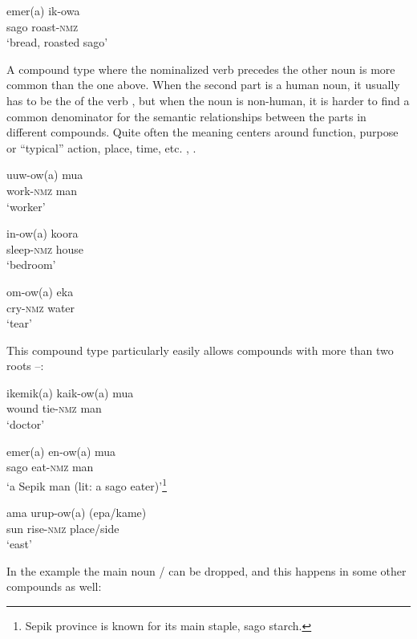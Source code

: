 \ea%
\label{ex:3:x1522}
\gll emer(a) ik-owa \\
sago roast-\textsc{nmz}\\
\glt`bread, roasted sago'
\z

A compound type where the nominalized verb precedes the other noun is more common than the one above. When the second part is a human noun, it usually has to be the  of the verb , but when the noun is non-human, it is harder to find a common denominator for the semantic relationships between the parts in different compounds. Quite often the meaning centers around function, purpose or ``typical'' action, place, time, etc. , .

\ea%
\label{ex:3:x52}
\gll uuw-ow(a) mua \\
work-\textsc{nmz} man\\
\glt`worker'
\z

\ea%
\label{ex:3:x53}
\gll in-ow(a) koora \\
sleep-\textsc{nmz} house\\
\glt`bedroom'
\z

\ea%
\label{ex:3:x54}
\gll om-ow(a) eka \\
cry-\textsc{nmz} water\\
\glt`tear'
\z

This compound type particularly easily allows compounds with more than two roots --: 

\ea%
\label{ex:3:x55}
\gll ikemik(a) kaik-ow(a) mua \\
wound tie-\textsc{nmz} man\\
\glt`doctor'
\z

\ea%
\label{ex:3:x56}
\gll emer(a) en-ow(a) mua \\
sago eat-\textsc{nmz} man\\
\glt`a Sepik man (lit: a sago eater)'\footnote{Sepik province is known for its main staple, sago starch.}
\z 

%
%

\ea%
\label{ex:3:x60}
\gll ama urup-ow(a) (epa/kame) \\
sun rise-\textsc{nmz} place/side\\
\glt`east'
\z

In the example  the main noun / can be dropped, and this happens in some other compounds as well:


